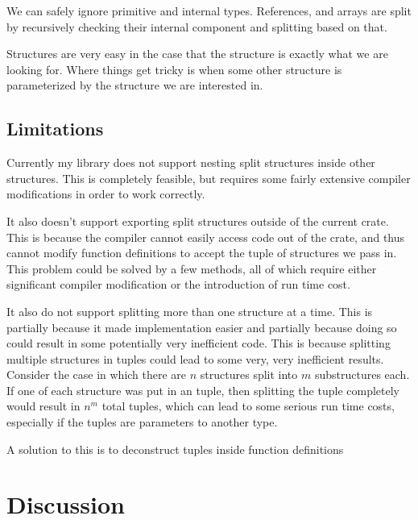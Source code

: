\documentclass[12pt,final]{article}
\begin{document}
We can safely ignore primitive and internal types. References, and
arrays are split by recursively checking their internal component and splitting
based on that.


Structures are very easy in the case that the structure is exactly what we are
looking for. Where things get tricky is when some other structure is
parameterized by the structure we are interested in. 



\subsection{Limitations}
\label{sec:limits}
Currently my library does not support nesting split structures inside other structures.
This is completely feasible, but requires some fairly extensive compiler
modifications in order to work correctly.

It also doesn't support exporting split structures outside of the current crate.
This is because the compiler cannot easily access code out of the crate, and
thus cannot modify function definitions to accept the tuple of structures we
pass in. This problem could be solved by a few methods, all of which require
either significant compiler modification or the introduction of run
time cost. 

It also do not support splitting more than one structure at a time. This is
partially because it made implementation easier and partially because doing so
could result in some potentially very inefficient code. This is because
splitting multiple structures in tuples could lead to some very, very
inefficient results. Consider the case in which there are $n$ structures split
into $m$ substructures each. If one of each structure was put in an tuple, then
splitting the tuple completely would result in $n^m$ total tuples, which can lead
to some serious run time costs, especially if the tuples are parameters to
another type.

A solution to this is to deconstruct tuples inside function definitions

\section{Discussion}
\label{sec:discuss}
\end{document}
